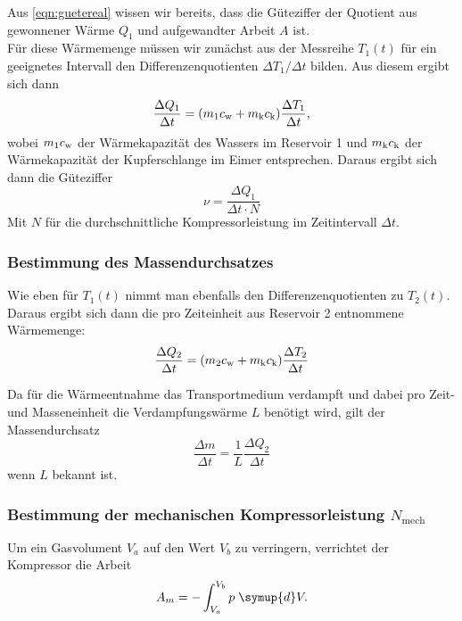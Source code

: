 Aus \ref{eqn:guetereal} wissen wir bereits, dass die Güteziffer der Quotient aus gewonnener Wärme 
$Q_1$ und aufgewandter Arbeit $A$ ist. \\
Für diese Wärmemenge müssen wir zunächst aus der Messreihe $T_1(t)$ für ein geeignetes Intervall 
den Differenzenquotienten $\Delta T_1 / \Delta t$ bilden. Aus diesem ergibt sich dann
\begin{equation}
	\frac{\Delta Q_1}{\Delta t}
	= (m_1 c_\text w + m_\text k c_\text k) \frac{\Delta T_1}{\Delta t},
	\label{eqn:bestgueteziffer1}
\end{equation}
wobei $m_1c_\text w$ der Wärmekapazität des Wassers im Reservoir 1 und $m_\text k c_\text k$ der
Wärmekapazität der Kupferschlange im Eimer entsprechen. Daraus ergibt sich dann die 
Güteziffer
\begin{equation}
	\nu = \frac{\Delta Q_1}{\Delta t \cdot N}
	\label{eqn:messgueteziffer}
\end{equation}
Mit $N$ für die durchschnittliche Kompressorleistung im Zeitintervall $\Delta t$.

\subsubsection{Bestimmung des Massendurchsatzes}

Wie eben für $T_1(t)$ nimmt man ebenfalls den Differenzenquotienten zu $T_2(t)$. Daraus 
ergibt sich dann die pro Zeiteinheit aus Reservoir 2 entnommene Wärmemenge:
\begin{equation}
	\frac{\Delta Q_2}{\Delta t}
	= (m_2 c_\text w + m_\text k c_\text k)  \frac{\Delta T_2}{\Delta t}
	\label{eqn:waermeleitung2}
\end{equation}

Da für die Wärmeentnahme das Transportmedium verdampft und dabei pro Zeit- und Masseneinheit die 
Verdampfungswärme $L$ benötigt wird, gilt der Massendurchsatz
\begin{equation}
	\frac{\Delta m}{\Delta t}
	=
	\frac{1}{L} \frac{\Delta Q_2}{\Delta t}
	\label{eqn:massendurchsatz}
\end{equation}
wenn $L$ bekannt ist.

\subsubsection{Bestimmung der mechanischen Kompressorleistung 
$N_\text{mech}$}

Um ein Gasvolument $V_a$ auf den Wert $V_b$ zu verringern, verrichtet der Kompressor die Arbeit
\begin{equation}
	A_m = 
	-\int_{V_a}^{V_b} p \; \symup{d}V.
	\label{eqn:arbeit-kompresion}
\end{equation}

